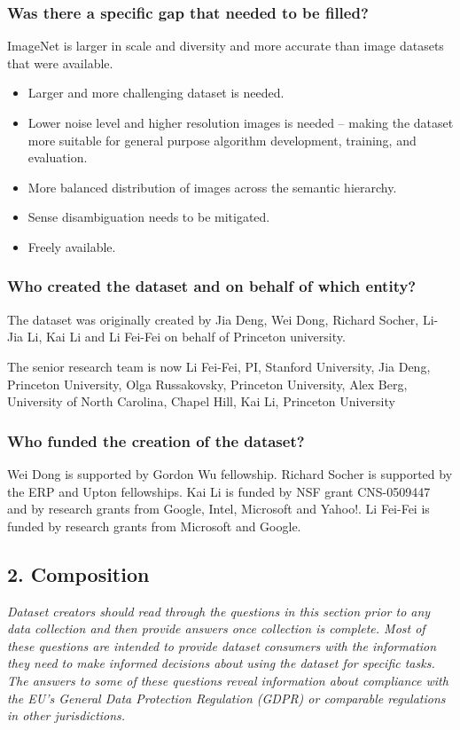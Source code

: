 \documentclass[a4paper,12pt]{article}
\begin{document}
\subsubsection*{Was there a specific gap that needed to be filled?}
ImageNet is larger in scale and diversity and more accurate than image datasets that were available.
\begin{itemize}
\item Larger and more challenging dataset is needed.
\item Lower noise level and higher resolution images is needed – making the dataset more
suitable for general purpose algorithm development, training, and evaluation.
\item More balanced distribution of images across the semantic hierarchy.
\item Sense disambiguation needs to be mitigated.
\item Freely available.
\end{itemize}

\subsubsection*{Who created the dataset and on behalf of which entity?}
The dataset was originally created by Jia Deng, Wei Dong, Richard Socher, Li-Jia Li, Kai Li
and Li Fei-Fei on behalf of Princeton university.

The senior research team is now Li Fei-Fei, PI, Stanford University, Jia Deng, Princeton
University, Olga Russakovsky, Princeton University, Alex Berg, University of North
Carolina, Chapel Hill, Kai Li, Princeton University


\subsubsection*{Who funded the creation of the dataset?}
Wei Dong is supported by Gordon Wu fellowship. Richard Socher is supported by the ERP and Upton
fellowships. Kai Li is funded by NSF grant CNS-0509447 and by research grants from Google, Intel,
Microsoft and Yahoo!. Li Fei-Fei is funded by research grants from Microsoft and Google.


\subsection*{2. Composition}
\textsl{Dataset creators should read through the questions in this section prior to
any data collection and then provide answers once collection is complete. Most of these
questions are intended to provide dataset consumers with the information they need to
make informed decisions about using the dataset for specific tasks. The answers to some of
these questions reveal information about compliance with the EU’s General Data Protection
Regulation (GDPR) or comparable regulations in other jurisdictions.}
\end{document}
